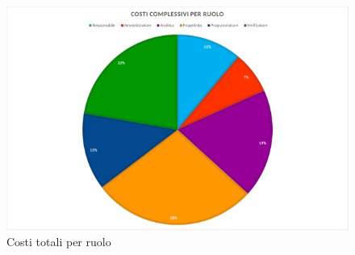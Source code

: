 \begin{figure}[H]
	\centering
	\includegraphics[width=14cm]{img_peconomico/T_CR_C.png}
	\caption{Costi totali per ruolo}
\end{figure}

